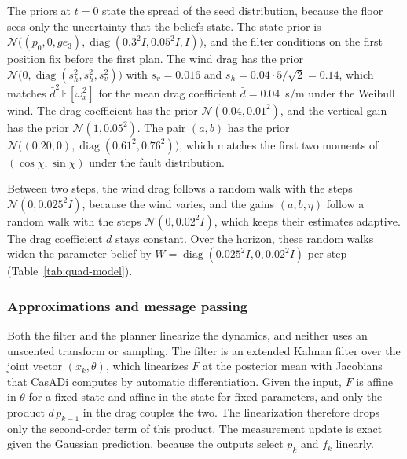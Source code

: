 \documentclass{l4dc2027}
\def\cN{\mathcal{N}}
\newcommand{\E}{\mathbb{E}}
\begin{document}
The priors at $t = 0$ state the spread of the seed distribution, because the floor sees only the uncertainty that the beliefs state. The state prior is $\cN\big((p_0, 0, g e_3), \operatorname{diag}(0.3^2 I, 0.05^2 I, I)\big)$, and the filter conditions on the first position fix before the first plan. The wind drag has the prior $\cN\big(0, \operatorname{diag}(s_h^2, s_h^2, s_v^2)\big)$ with $s_v = 0.016$ and $s_h = 0.04 \cdot 5/\sqrt{2} = 0.14$, which matches $\bar d^2\, \E[\omega_x^2]$ for the mean drag coefficient $\bar d = 0.04$~s/m under the Weibull wind. The drag coefficient has the prior $\cN(0.04, 0.01^2)$, and the vertical gain has the prior $\cN(1, 0.05^2)$. The pair $(a, b)$ has the prior $\cN\big((0.20, 0), \operatorname{diag}(0.61^2, 0.76^2)\big)$, which matches the first two moments of $(\cos\chi, \sin\chi)$ under the fault distribution.

Between two steps, the wind drag follows a random walk with the steps $\cN(0, 0.025^2 I)$, because the wind varies, and the gains $(a, b, \eta)$ follow a random walk with the steps $\cN(0, 0.02^2 I)$, which keeps their estimates adaptive. The drag coefficient $d$ stays constant. Over the horizon, these random walks widen the parameter belief by $W = \operatorname{diag}(0.025^2 I, 0, 0.02^2 I)$ per step (Table~\ref{tab:quad-model}).

\subsubsection{Approximations and message passing}\label{supp:quad-approximations}

Both the filter and the planner linearize the dynamics, and neither uses an unscented transform or sampling. The filter is an extended Kalman filter over the joint vector $(x_k, \theta)$, which linearizes $F$ at the posterior mean with Jacobians that CasADi computes by automatic differentiation. Given the input, $F$ is affine in $\theta$ for a fixed state and affine in the state for fixed parameters, and only the product $d\,\dot p_{k-1}$ in the drag couples the two. The linearization therefore drops only the second-order term of this product. The measurement update is exact given the Gaussian prediction, because the outputs select $p_k$ and $f_k$ linearly.
\end{document}
